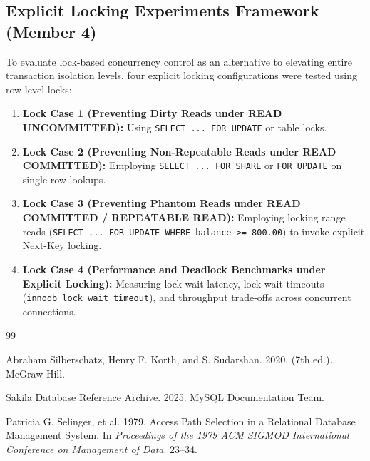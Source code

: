 \documentclass[sigconf, pbalance, nonacm]{acmart}
\begin{document}
\subsection{Explicit Locking Experiments Framework (Member 4)}
To evaluate lock-based concurrency control as an alternative to elevating entire transaction isolation levels, four explicit locking configurations were tested using row-level locks:
\begin{enumerate}
    \item \textbf{Lock Case 1 (Preventing Dirty Reads under READ UNCOMMITTED):} Using \texttt{SELECT ... FOR UPDATE} or table locks.
    \item \textbf{Lock Case 2 (Preventing Non-Repeatable Reads under READ COMMITTED):} Employing \texttt{SELECT ... FOR SHARE} or \texttt{FOR UPDATE} on single-row lookups.
    \item \textbf{Lock Case 3 (Preventing Phantom Reads under READ COMMITTED / REPEATABLE READ):} Employing locking range reads (\texttt{SELECT ... FOR UPDATE WHERE balance >= 800.00}) to invoke explicit Next-Key locking.
    \item \textbf{Lock Case 4 (Performance and Deadlock Benchmarks under Explicit Locking):} Measuring lock-wait latency, lock wait timeouts (\texttt{innodb\_lock\_wait\_timeout}), and throughput trade-offs across concurrent connections.
\end{enumerate}


\begin{thebibliography}{99}

Abraham Silberschatz, Henry F. Korth, and S. Sudarshan. 2020.
 (7th ed.).
\newblock McGraw-Hill.

Sakila Database Reference Archive. 2025.
\newblock MySQL Documentation Team.

Patricia G. Selinger, et al. 1979.
\newblock Access Path Selection in a Relational Database Management System.
\newblock In {\em Proceedings of the 1979 ACM SIGMOD International Conference on Management of Data}. 23--34.

\end{thebibliography}
\end{document}
